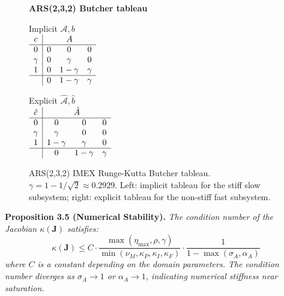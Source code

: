 \documentclass[10pt]{article}
\providecommand{\Description}[1]{}
\begin{document}
\begin{figure}[htbp]
\centering
\textbf{ARS(2,3,2) Butcher tableau}\\[2mm]
\begin{minipage}{0.45\textwidth}
\centering
Implicit $\mathcal{A}, b$\\
$\begin{array}{c|ccc}
c & \multicolumn{3}{c}{A} \\ \hline
0 & 0 & 0 & 0 \\
\gamma & 0 & \gamma & 0 \\
1 & 0 & 1-\gamma & \gamma \\ \hline
& 0 & 1-\gamma & \gamma
\end{array}$
\end{minipage}
\hfill
\begin{minipage}{0.45\textwidth}
\centering
Explicit $\hat{\mathcal{A}}, \hat{b}$\\
$\begin{array}{c|ccc}
\hat{c} & \multicolumn{3}{c}{\hat{A}} \\ \hline
0 & 0 & 0 & 0 \\
\gamma & \gamma & 0 & 0 \\
1 & 1-\gamma & \gamma & 0 \\ \hline
& 0 & 1-\gamma & \gamma
\end{array}$
\end{minipage}
\caption{ARS(2,3,2) IMEX Runge-Kutta Butcher tableau. $\gamma = 1 - 1/\sqrt{2} \approx 0.2929$. Left: implicit tableau for the stiff slow subsystem; right: explicit tableau for the non-stiff fast subsystem.}\label{fig:butcher-tableau}
\Description{Two side-by-side Butcher tableaux. Left: implicit tableau for the stiff slow subsystem with coefficients A and b. Right: explicit tableau for the non-stiff fast subsystem with coefficients hat-A and hat-b. Gamma = 1 - 1/sqrt(2) approximately 0.2929.}
\end{figure}

\textbf{Proposition 3.5 (Numerical Stability).} %
\textit{The condition number of the Jacobian $\kappa(\mathbf{J})$ satisfies:
\begin{equation}\label{eq:condition-number}
\kappa(\mathbf{J}) \leq C \cdot \frac{\max(\eta_{\max}, \rho, \gamma)}{\min(\nu_M, \kappa_P, \kappa_I, \kappa_F)} \cdot \frac{1}{1 - \max(\sigma_A, \alpha_A)}
\end{equation}
where $C$ is a constant depending on the domain parameters. The condition
number diverges as $\sigma_A \to 1$ or $\alpha_A \to 1$, indicating
numerical stiffness near saturation.}
\end{document}
